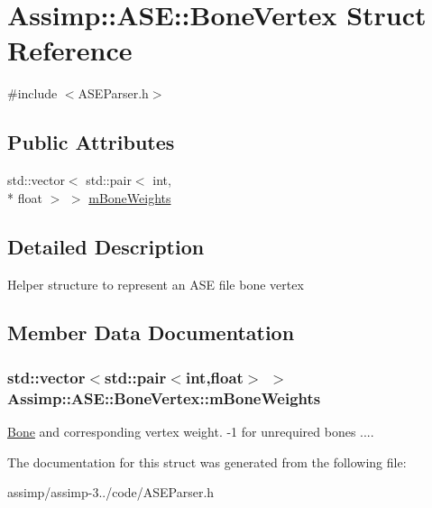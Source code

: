 \hypertarget{struct_assimp_1_1_a_s_e_1_1_bone_vertex}{\section{Assimp\+:\+:A\+S\+E\+:\+:Bone\+Vertex Struct Reference}
\label{struct_assimp_1_1_a_s_e_1_1_bone_vertex}
}


{\ttfamily \#include $<$A\+S\+E\+Parser.\+h$>$}

\subsection*{Public Attributes}
\begin{DoxyCompactItemize}
\item 
std\+::vector$<$ std\+::pair$<$ int, \\*
float $>$ $>$ \hyperlink{struct_assimp_1_1_a_s_e_1_1_bone_vertex_ad914347762a500ac330e5e57df02a11e}{m\+Bone\+Weights}
\end{DoxyCompactItemize}


\subsection{Detailed Description}
Helper structure to represent an A\+S\+E file bone vertex 

\subsection{Member Data Documentation}
\hypertarget{struct_assimp_1_1_a_s_e_1_1_bone_vertex_ad914347762a500ac330e5e57df02a11e}{
\subsubsection[{m\+Bone\+Weights}]{\setlength{\rightskip}{0pt plus 5cm}std\+::vector$<$std\+::pair$<$int,float$>$ $>$ Assimp\+::\+A\+S\+E\+::\+Bone\+Vertex\+::m\+Bone\+Weights}}\label{struct_assimp_1_1_a_s_e_1_1_bone_vertex_ad914347762a500ac330e5e57df02a11e}
\hyperlink{struct_assimp_1_1_a_s_e_1_1_bone}{Bone} and corresponding vertex weight. -\/1 for unrequired bones .... 

The documentation for this struct was generated from the following file\+:\begin{DoxyCompactItemize}
\item 
assimp/assimp-\/3../code/A\+S\+E\+Parser.\+h\end{DoxyCompactItemize}
